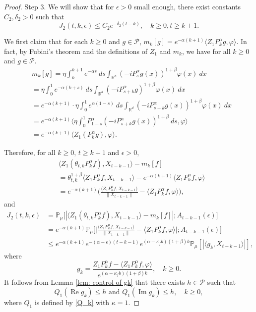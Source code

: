 \documentclass[12pt,a4paper]{amsart}
\theoremstyle{plain}
\theoremstyle{definition}
\numberwithin{equation}{section}
\begin{document}
\begin{proof}
    Step 3.
    We will show that for $\epsilon>0$ small enough, there exist constants $C_2, \delta_2>0$ such that
\begin{equation}
\label{eq:31step3}
    J_2(t,k,\epsilon)
    \leq C_2e^{-\delta_2 (t-k)},
    \quad k\geq 0, t\geq k+1.
\end{equation}

 We first claim that for each $k\geq0$ and $g\in \mathcal P$, $m_k[g]=e^{-\alpha(k+1)}\langle Z_1P_k^{\alpha}g, \varphi \rangle$. 
In fact, by Fubini's theorem and the definitions of $Z_1$ and $m_k$, we have for all $k\geq 0$ and $g\in \mathcal P$.
\begin{align}
	&m_k[g]
        = \eta \int_k^{k+1}e^{-\alpha s}~ds\int_{\mathbb R^d} (-iP_{s}^\alpha g(x))^{1+\beta} \varphi(x)~dx\\
       &=\eta \int_0^1e^{-\alpha (k+s)}~ds\int_{\mathbb R^d} (-iP_{s+k}^\alpha g)^{1+\beta}\varphi(x)~dx\\
       &=e^{-\alpha(k+1)} \cdot \eta \int_0^{1}e^{\alpha(1- s)}~ds\int_{\mathbb R^d} (-iP_{s+k}^\alpha        g(x))^{1+\beta} \varphi(x)~dx\\
      &=e^{-\alpha(k+1)}\langle \eta \int_0^1P_{1-s}^{\alpha}(-iP_{s+k}^\alpha g(x))^{1+\beta}~ds, \varphi \rangle\\
      &=e^{-\alpha(k+1)}\langle Z_1(P_k^{\alpha}g), \varphi \rangle.
\end{align}

Therefore, for all $k\geq 0$, $t\geq k+1$ and $\epsilon> 0$,
\begin{align}
    &\langle Z_1(\theta_{t,k}P^\alpha_k f),X_{t-k-1}\rangle-m_k[f]
    \\&= \theta_{t,k}^{1+\beta} \langle Z_1P^\alpha_k f,X_{t-k-1}\rangle - e^{-\alpha (k+1)}\langle  Z_1P^\alpha_k f,\varphi\rangle
    \\&=e^{-\alpha (k+1)}\Big(\frac{\langle Z_1P^\alpha_k f ,X_{t-k-1}\rangle}{\|X_{t-k-1}\|}-\langle  Z_1P^\alpha_k f ,\varphi\rangle\Big),
\end{align}
and
\begin{align}
\label{eq: prevJ2}
    J_2(t,k,\epsilon)&
    = \mathbb P_\mu\big[|\langle Z_1(\theta_{t,k}P^\alpha_k f),X_{t-k-1}\rangle-m_k[f]|;A_{t-k-1}(\epsilon)\big]
    \\&=e^{-\alpha( k+1)}\mathbb{P}_{\mu}\bigg[\Big|\frac{\langle Z_1P^{\alpha}_k f,X_{t-k-1}\rangle}{\|X_{t-k-1}\|}-\langle  Z_1P^{\alpha}_k f,\varphi\rangle\Big|;A_{t-k-1}(\epsilon)\bigg]\nonumber\\
    &\leq e^{-\alpha (k+1)}e^{-(\alpha-\epsilon)(t-k-1)}e^{(\alpha-\kappa_f b)(1+\beta)k} \mathbb{P}_{\mu}\left[\left|\langle g_k,X_{t-k-1}\rangle\right|\right],
\end{align}
where
\[
    g_k
    = \frac{Z_1 P^{\alpha}_k f-\langle  Z_1P^{\alpha}_k f,\varphi\rangle}{e^{(\alpha-\kappa_f b)(1+\beta)k}},
    \quad k \geq 0.
\]
    It follows from Lemma \ref{lem: control of gk} that there exists $h\in \mathcal{P}$ such that
 \[
    Q_1 (\operatorname{Re} g_k) \leq h
    \text{ and } Q_1 (\operatorname{Im} g_k)\leq h,
    \quad k \geq 0,
 \]
    where $Q_1$ is defined by \eqref{Q_k} with $\kappa=1$.


\end{proof}
\end{document}
